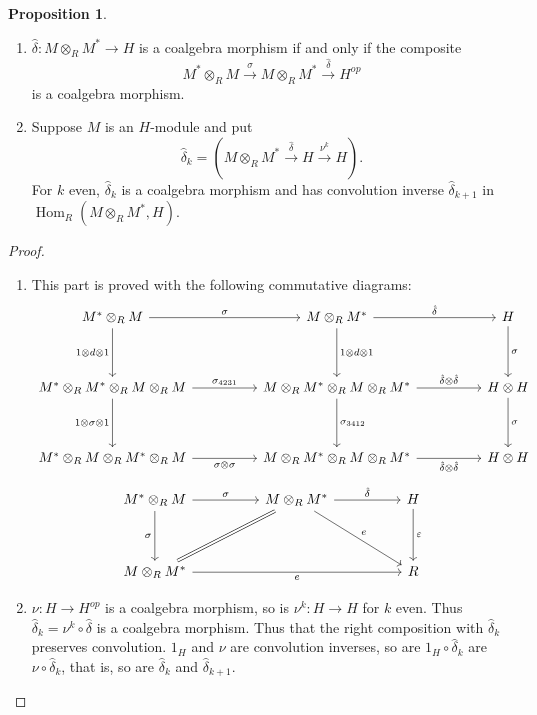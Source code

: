 \documentclass[8pt]{article}
\theoremstyle{definition}
\theoremstyle{definition}
\theoremstyle{definition}
\theoremstyle{definition}
\theoremstyle{definition}
\theoremstyle{definition}
\theoremstyle{definition}
\newtheorem{prop}{Proposition}[section]
\theoremstyle{definition}
\theoremstyle{definition}
\theoremstyle{definition}
\theoremstyle{definition}
\theoremstyle{definition}
\theoremstyle{definition}
\theoremstyle{definition}
\theoremstyle{question}
\begin{document}
\begin{prop} $ $
  
  \begin{enumerate}
    \item $\hat{\delta} : M \otimes_R M^* \to H$ is a coalgebra morphism if and only if the composite
    \[
    M^* \otimes_R M \xrightarrow{\sigma} M \otimes_R M^* \xrightarrow{\hat{\delta}} H^{op}
    \]
    is a coalgebra morphism.
    \item Suppose $M$ is an $H$-module and put
    \[
    \hat{\delta}_k = (M \otimes_R M^* \xrightarrow{\hat{\delta}} H \xrightarrow{{\nu}^k} H).
    \]
    For $k$ even, $\hat{\delta}_k$ is a coalgebra morphism and has convolution inverse $\hat{\delta}_{k + 1}$ in 
    $\operatorname{Hom}_R(M \otimes_R M^*, H)$.
  \end{enumerate}
\end{prop}
\begin{proof} $ $

  \begin{enumerate}
    \item This part is proved with the following commutative diagrams:
    \[
    \begin{tikzcd}
      M^* \otimes_R M \ar[rr, "\sigma"] \ar[dd, "1 \otimes d \otimes 1"'] && M \otimes_R M^* \ar[dd, "1 \otimes d \otimes 1"] \ar[rr, "\hat{\delta}"] && H \ar[dd, "\sigma"] \\
      \\
      M^* \otimes_R M^* \otimes_R M \otimes_R M \ar[rr, "\sigma_{4231}"] \ar[dd, "1 \otimes \sigma \otimes 1"'] && M \otimes_R M^* \otimes_R M \otimes_R M^* \ar[dd, "\sigma_{3412}"] \ar[rr, "\hat{\delta} \otimes \hat{\delta}"] && H \otimes H \ar[dd, "\sigma"] \\
      \\
      M^* \otimes_R M \otimes_R M^* \otimes_R M \ar[rr, "\sigma \otimes \sigma"'] && M \otimes_R M^* \otimes_R M \otimes_R M^* \ar[rr, "\hat{\delta} \otimes \hat{\delta}"'] && H \otimes H
    \end{tikzcd}
    \]
    \[
    \begin{tikzcd}
      M^* \otimes_R M \ar[rr, "\sigma"] \ar[dd, "\sigma"'] && M \otimes_R M^* \ar[ddrr, "e"] \ar[ddll, equal] \ar[rr, "\hat{\delta}"] && H \ar[dd, "\varepsilon"]\\
      \\
      M \otimes_R M^* \ar[rrrr, "e"'] &&&& R
    \end{tikzcd}
    \]
    \item $\nu : H \to H^{op}$ is a coalgebra morphism, so is $\nu^{k} : H \to H$ for $k$ even. Thus 
    $\hat{\delta}_k = \nu^k \circ \hat{\delta}$ is a coalgebra morphism.
    Thus that the right composition with $\hat{\delta}_k$ preserves convolution. $1_H$ and $\nu$ are convolution inverses, so are
    $1_H \circ \hat{\delta}_k$ are $\nu \circ \hat{\delta}_k$, that is, so are $\hat{\delta}_k$ and $\hat{\delta}_{k + 1}$.
  \end{enumerate}
\end{proof}
\end{document}
